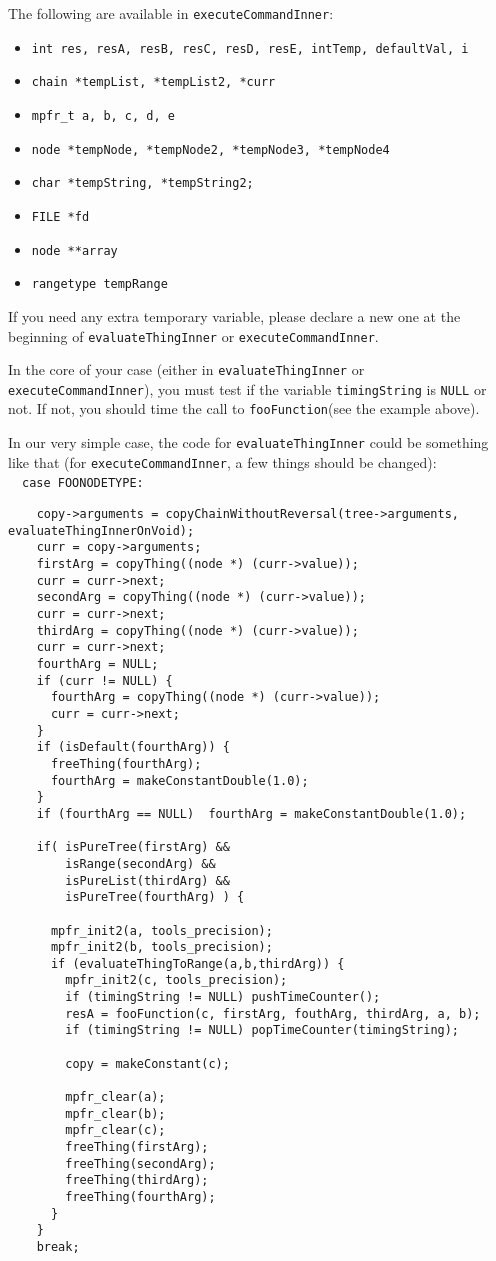 \documentclass{article}
\newcommand{\commandFunction}{\texttt{fooFunction}\xspace}
\newcommand{\commandNodeName}{\texttt{FOONODETYPE}\xspace}
\begin{document}
The following are available in \texttt{executeCommandInner}:

\begin{itemize}
\item \texttt{int res, resA, resB, resC, resD, resE, intTemp, defaultVal, i}
\item \texttt{chain *tempList, *tempList2, *curr}
\item \texttt{mpfr\_t a, b, c, d, e}
\item \texttt{node *tempNode, *tempNode2, *tempNode3, *tempNode4}
\item \texttt{char *tempString, *tempString2;}
\item \texttt{FILE *fd}
\item \texttt{node **array}
\item \texttt{rangetype tempRange}
\end{itemize}

If you need any extra temporary variable, please declare a new one at the beginning of \texttt{evaluateThingInner} or \texttt{executeCommandInner}.

In the core of your case (either in  \texttt{evaluateThingInner} or \texttt{executeCommandInner}), you must test if the variable \texttt{timingString} is \texttt{NULL} or not. If not, you should time the call to \commandFunction (see the example above).

In our very simple case, the code for \texttt{evaluateThingInner} could be something like that (for \texttt{executeCommandInner}, a few things should be changed):\\
\phantom{1}~~\texttt{case }\commandNodeName\texttt{:}
\begin{verbatim}
    copy->arguments = copyChainWithoutReversal(tree->arguments, evaluateThingInnerOnVoid);
    curr = copy->arguments;
    firstArg = copyThing((node *) (curr->value));
    curr = curr->next;
    secondArg = copyThing((node *) (curr->value));
    curr = curr->next;
    thirdArg = copyThing((node *) (curr->value));
    curr = curr->next;
    fourthArg = NULL;
    if (curr != NULL) {
      fourthArg = copyThing((node *) (curr->value));
      curr = curr->next;
    }
    if (isDefault(fourthArg)) {
      freeThing(fourthArg);
      fourthArg = makeConstantDouble(1.0);
    }
    if (fourthArg == NULL)  fourthArg = makeConstantDouble(1.0);

    if( isPureTree(firstArg) && 
        isRange(secondArg) &&
        isPureList(thirdArg) &&
        isPureTree(fourthArg) ) {

      mpfr_init2(a, tools_precision);
      mpfr_init2(b, tools_precision);
      if (evaluateThingToRange(a,b,thirdArg)) {
        mpfr_init2(c, tools_precision);
        if (timingString != NULL) pushTimeCounter(); 
        resA = fooFunction(c, firstArg, fouthArg, thirdArg, a, b);
        if (timingString != NULL) popTimeCounter(timingString);

        copy = makeConstant(c);

        mpfr_clear(a);
        mpfr_clear(b);
        mpfr_clear(c);
        freeThing(firstArg);
        freeThing(secondArg);
        freeThing(thirdArg);
        freeThing(fourthArg);
      }
    }
    break;
\end{verbatim}
\end{document}
